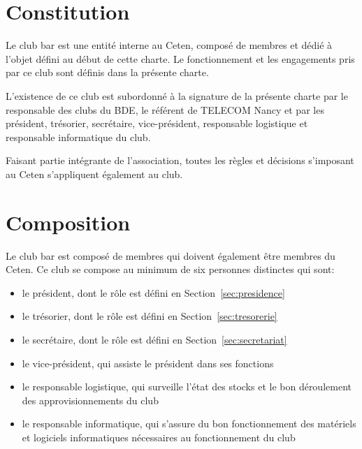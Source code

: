 \documentclass{article} %
\begin{document}
	\begin{multicols}{2}

		\section{Constitution}
\label{sec:constitution}
		
		{\small

			Le club bar est une entité interne au Ceten, composé de membres et
			dédié à l'objet défini au début de cette charte. Le fonctionnement
			et les engagements pris par ce club sont définis dans la présente
			charte.

			L'existence de ce club est subordonné à la signature de la présente
			charte par le responsable des clubs du BDE, le référent de TELECOM
			Nancy et par les président, trésorier, secrétaire, vice-président,
			responsable logistique et responsable informatique du club.
			
			Faisant partie intégrante de l’association, toutes les règles et
			décisions s’imposant au Ceten s’appliquent également au club.

		}

		\section{Composition}
\label{sec:composition}

		{\small
		
			Le club bar est composé de membres qui doivent également être
			membres du Ceten. Ce club se compose au minimum de six personnes
			distinctes qui sont:
			\begin{itemize}
				\item le président, dont le rôle est défini en
					Section~\ref{sec:presidence}
				\item le trésorier, dont le rôle est défini en
					Section~\ref{sec:tresorerie}
				\item le secrétaire, dont le rôle est défini en
					Section~\ref{sec:secretariat}
				\item le vice-président, qui assiste le président dans ses
					fonctions
				\item le responsable logistique, qui surveille l'état des stocks
					et le bon déroulement des approvisionnements du club
				\item le responsable informatique, qui s'assure du bon
					fonctionnement des matériels et logiciels informatiques
					nécessaires au fonctionnement du club
			\end{itemize}

}
\end{multicols}
\end{document}
